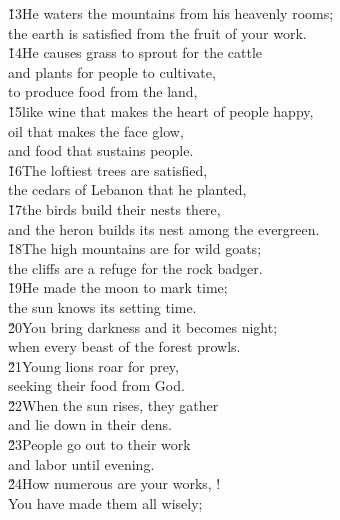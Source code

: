 \begin{poetry}
\poeml \v{13}He waters the mountains from his heavenly rooms; \\
\poemll    the earth is satisfied from the fruit of your work. \\
\poeml \v{14}He causes grass to sprout for the cattle \\
\poemll    and plants for people to cultivate, \\
\poemlll       to produce food from the land, \\
\poeml \v{15}like wine that makes the heart of people happy, \\
\poemll    oil that makes the face glow, \\
\poemlll       and food that sustains people. \\
\poeml \v{16}The loftiest trees are satisfied, \\
\poemll    the cedars of Lebanon that he planted, \\
\poeml \v{17}the birds build their nests there, \\
\poemll    and the heron builds its nest among the evergreen. \\
\poeml \v{18}The high mountains are for wild goats; \\
\poemll    the cliffs are a refuge for the rock badger. \\
\poeml \v{19}He made the moon to mark time; \\
\poemll    the sun knows its setting time. \\
\poeml \v{20}You bring darkness and it becomes night; \\
\poemll    when every beast of the forest prowls. \\
\poeml \v{21}Young lions roar for prey, \\
\poemll    seeking their food from God. \\
\poeml \v{22}When the sun rises, they gather \\
\poemll    and lie down in their dens. \\
\poeml \v{23}People go out to their work \\
\poemll    and labor until evening. \\
\poeml \v{24}How numerous are your works, ! \\
\poemll    You have made them all wisely; \\

\end{poetry}
